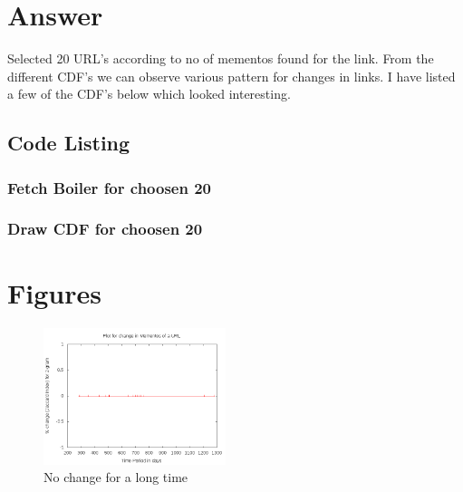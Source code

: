 \documentclass{article}
\begin{document}
\section{Answer}

Selected 20 URL's according to no of mementos found for the link. From the different CDF's we can observe various pattern for changes in links. I have listed a few of the CDF's below which looked interesting.

\subsection{Code Listing}
\subsubsection{Fetch Boiler for choosen 20}



\newpage

\subsubsection{Draw CDF for choosen 20}



\newpage

\section{Figures}

\begin{center}
\begin{figure}[ht]
    \centering
    \includegraphics[width=0.475\textwidth,natwidth=700,natheight=700]{choosen_20_11.png}
    \caption{No change for a long time}
    \label{fig:choosen_20_11.png}
\end{figure}
\end{center}
\end{document}
